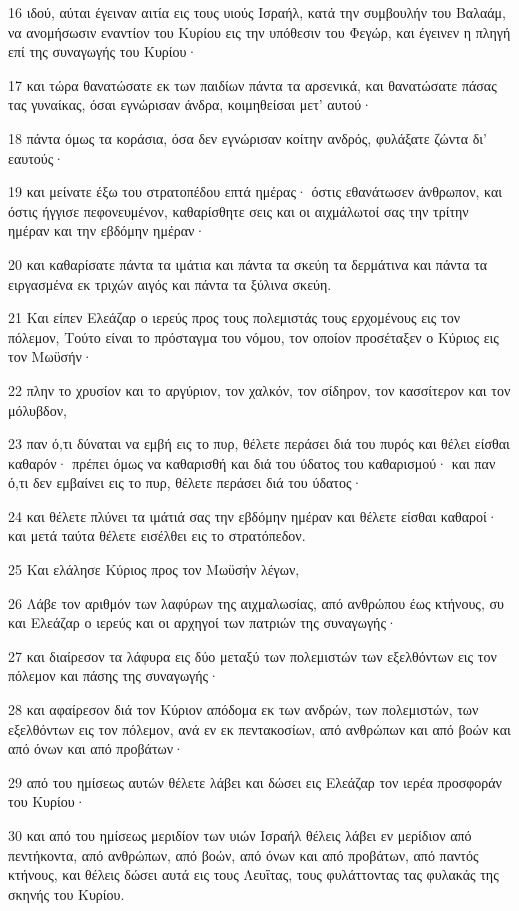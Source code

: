 \par 16 ιδού, αύται έγειναν αιτία εις τους υιούς Ισραήλ, κατά την συμβουλήν του Βαλαάμ, να ανομήσωσιν εναντίον του Κυρίου εις την υπόθεσιν του Φεγώρ, και έγεινεν η πληγή επί της συναγωγής του Κυρίου·
\par 17 και τώρα θανατώσατε εκ των παιδίων πάντα τα αρσενικά, και θανατώσατε πάσας τας γυναίκας, όσαι εγνώρισαν άνδρα, κοιμηθείσαι μετ' αυτού·
\par 18 πάντα όμως τα κοράσια, όσα δεν εγνώρισαν κοίτην ανδρός, φυλάξατε ζώντα δι' εαυτούς·
\par 19 και μείνατε έξω του στρατοπέδου επτά ημέρας· όστις εθανάτωσεν άνθρωπον, και όστις ήγγισε πεφονευμένον, καθαρίσθητε σεις και οι αιχμάλωτοί σας την τρίτην ημέραν και την εβδόμην ημέραν·
\par 20 και καθαρίσατε πάντα τα ιμάτια και πάντα τα σκεύη τα δερμάτινα και πάντα τα ειργασμένα εκ τριχών αιγός και πάντα τα ξύλινα σκεύη.
\par 21 Και είπεν Ελεάζαρ ο ιερεύς προς τους πολεμιστάς τους ερχομένους εις τον πόλεμον, Τούτο είναι το πρόσταγμα του νόμου, τον οποίον προσέταξεν ο Κύριος εις τον Μωϋσήν·
\par 22 πλην το χρυσίον και το αργύριον, τον χαλκόν, τον σίδηρον, τον κασσίτερον και τον μόλυβδον,
\par 23 παν ό,τι δύναται να εμβή εις το πυρ, θέλετε περάσει διά του πυρός και θέλει είσθαι καθαρόν· πρέπει όμως να καθαρισθή και διά του ύδατος του καθαρισμού· και παν ό,τι δεν εμβαίνει εις το πυρ, θέλετε περάσει διά του ύδατος·
\par 24 και θέλετε πλύνει τα ιμάτιά σας την εβδόμην ημέραν και θέλετε είσθαι καθαροί· και μετά ταύτα θέλετε εισέλθει εις το στρατόπεδον.
\par 25 Και ελάλησε Κύριος προς τον Μωϋσήν λέγων,
\par 26 Λάβε τον αριθμόν των λαφύρων της αιχμαλωσίας, από ανθρώπου έως κτήνους, συ και Ελεάζαρ ο ιερεύς και οι αρχηγοί των πατριών της συναγωγής·
\par 27 και διαίρεσον τα λάφυρα εις δύο μεταξύ των πολεμιστών των εξελθόντων εις τον πόλεμον και πάσης της συναγωγής·
\par 28 και αφαίρεσον διά τον Κύριον απόδομα εκ των ανδρών, των πολεμιστών, των εξελθόντων εις τον πόλεμον, ανά εν εκ πεντακοσίων, από ανθρώπων και από βοών και από όνων και από προβάτων·
\par 29 από του ημίσεως αυτών θέλετε λάβει και δώσει εις Ελεάζαρ τον ιερέα προσφοράν του Κυρίου·
\par 30 και από του ημίσεως μεριδίον των υιών Ισραήλ θέλεις λάβει εν μερίδιον από πεντήκοντα, από ανθρώπων, από βοών, από όνων και από προβάτων, από παντός κτήνους, και θέλεις δώσει αυτά εις τους Λευΐτας, τους φυλάττοντας τας φυλακάς της σκηνής του Κυρίου.
